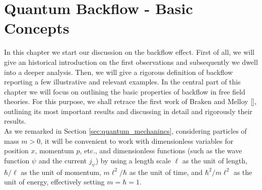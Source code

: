 \chapter{Quantum Backflow - Basic Concepts}
\label{chapter2}

In this chapter we start our discussion on the backflow effect. First of all, we will give an historical introduction on the first observations and subsequently we dwell into a deeper analysis. Then, we will give a rigorous definition of backflow reporting a few illustrative and relevant examples. In the central part of this chapter we will focus on outlining the basic properties of backflow in free field theories. For this purpose, we shall retrace the first work of Braken and Melloy [\citealp{bracken}], outlining its most important results and discussing in detail and rigorously their results.\\
As we remarked in Section \ref{sec:quantum_mechanincs}, considering particles of mass $m>0$, it will be convenient to work with dimensionless variables for position $x$, momentum $p$, etc., and dimensionless functions (such as the wave function $\psi$ and the current $j_\psi$) by using a length scale $\ell$ as the unit of length, $\hbar/\ell$ as the unit of momentum, $m\ell^2/\hbar$ as the unit of time, and $\hbar^2/m\ell^2$ as the unit of energy, effectively setting $m=\hbar=1$.




